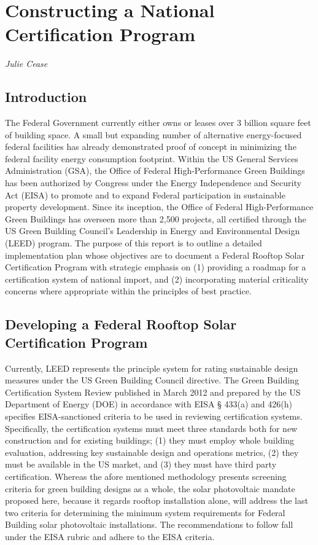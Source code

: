 \section{Constructing a National Certification Program}

\emph{Julie Cease}

\subsection{Introduction}
The Federal Government currently either owns or leases over 3 billion square feet of building space. A small but expanding number of alternative energy-focused federal facilities has already demonstrated proof of concept in minimizing the federal facility energy consumption footprint. Within the US General Services Administration (GSA), the Office of Federal High-Performance Green Buildings has been authorized by Congress under the Energy Independence and Security Act (EISA) to promote and to expand Federal participation in sustainable property development. Since its inception, the Office of Federal High-Performance Green Buildings has overseen more than 2,500 projects, all certified through the US Green Building Council’s Leadership in Energy and Environmental Design (LEED) program. The purpose of this report is to outline a detailed implementation plan whose objectives are to document a Federal Rooftop Solar Certification Program with strategic emphasis on (1) providing a roadmap for a certification system of national import, and (2) incorporating material criticality concerns where appropriate within the principles of best practice.


\subsection{Developing a Federal Rooftop Solar Certification Program}
Currently, LEED represents the principle system for rating sustainable design measures under the US Green Building Council directive. The Green Building Certification System Review published in March 2012 and prepared by the US Department of Energy (DOE) in accordance with EISA § 433(a) and 426(h) specifies EISA-sanctioned criteria to be used in reviewing certification systems. Specifically, the certification systems must meet three standards both for new construction and for existing buildings; (1) they must employ whole building evaluation, addressing key sustainable design and operations metrics, (2) they must be available in the US market, and (3) they must have third party certification. Whereas the afore mentioned methodology presents screening criteria for green building designs as a whole, the solar photovoltaic mandate proposed here, because it regards rooftop installation alone, will address the last two criteria for determining the minimum system requirements for Federal Building solar photovoltaic installations. The recommendations to follow fall under the EISA rubric and adhere to the EISA criteria.


